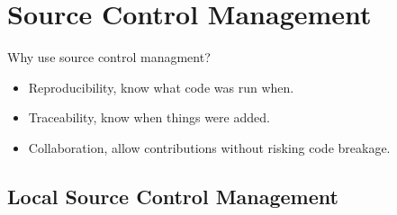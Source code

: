 \section{Source Control Management}

Why use source control managment?
\begin{frame}
  \begin{itemize}
    \item Reproducibility, know what code was run when.
    \item Traceability, know when things were added.
    \item Collaboration, allow contributions without risking code breakage.
  \end{itemize}
\end{frame}

\subsection{Local Source Control Management}
\begin{frame}
\begin{columns}[c]
\column{2in}
\column{1in}
\end{columns}
\end{frame}

